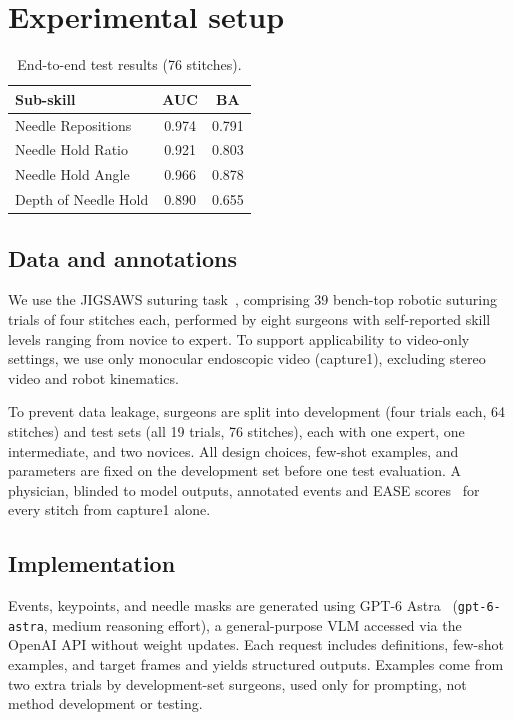 \section{Experimental setup}
\label{sec:setup}

\begin{table}[t]
\centering
\small
\setlength{\tabcolsep}{12pt}
\caption{End-to-end test results (76 stitches).}
\label{tab:e2e}
\begin{tabular}{@{}lcc@{}}
\hline
Sub-skill & AUC & BA \\
\hline
Needle Repositions & 0.974 & 0.791 \\
Needle Hold Ratio & 0.921 & 0.803 \\
Needle Hold Angle & 0.966 & 0.878 \\
Depth of Needle Hold & 0.890 & 0.655 \\
\hline
\end{tabular}
\end{table}



\subsection{Data and annotations}
\label{ssec:data}

We use the JIGSAWS suturing task~\cite{Gao2014}, comprising 39 bench-top
robotic suturing trials of four stitches each, performed by eight surgeons
with self-reported skill levels ranging from novice to expert. To support
applicability to video-only settings, we use only monocular endoscopic video
(capture1), excluding stereo video and robot kinematics.

To prevent data leakage, surgeons are split into development (four trials each, 64 stitches)
and test sets (all 19 trials, 76 stitches), each with one expert, one
intermediate, and two novices. All design choices, few-shot examples,
and parameters are fixed on the development set before one test
evaluation. A physician, blinded to model outputs, annotated events and EASE
scores~\cite{Haque2022} for every stitch from capture1 alone.

\subsection{Implementation}
\label{ssec:implementation}

Events, keypoints, and needle masks are generated using GPT-6
Astra~\cite{OpenAI2026Astra} (\texttt{gpt-6-astra}, medium reasoning
effort), a general-purpose VLM accessed via the OpenAI API without weight
updates. Each request includes definitions, few-shot examples, and target
frames and yields structured outputs. Examples come from two extra trials by
development-set surgeons, used only for prompting, not method development or
testing.

